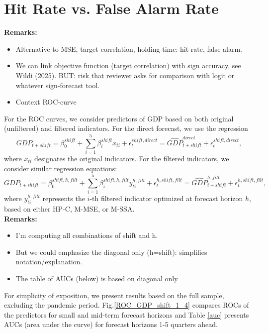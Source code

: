 \documentclass[a4paper]{article}
\begin{document}
\section{Hit Rate vs. False Alarm Rate}


\textbf{Remarks:}
\begin{itemize}
\item Alternative to MSE, target correlation, holding-time: hit-rate, false alarm. 
\item We can link objective function (target correlation) with sign accuracy, see Wildi (2025). BUT: risk that reviewer asks for comparison with logit or whatever sign-forecast tool.
\item Context ROC-curve
\end{itemize}
For the ROC curves, we consider predictors of GDP based on both original (unfiltered) and filtered indicators. For the direct forecast, we use the regression
\[
GDP_{t+shift}=\beta_0^{shift}+\sum_{i=1}^5\beta_i^{shift}x_{ti}+\epsilon_{t}^{shift,direct}=\hat{GDP}_{t+shift}^{direct}+\epsilon_{t}^{shift,direct},
\]
where $x_{ti}$ designates the original indicators. 
For the filtered indicators, we consider similar regression equations:
\[GDP_{t+shift}=\beta_0^{shift,h,filt}+\sum_{i=1}^5\beta_i^{shift,h,filt}y_{ti}^{h,filt}+\epsilon_{t}^{h,shift,filt}=\hat{GDP}_{t+shift}^{h,filt}+\epsilon_{t}^{h,shift,filt},\]
where $y_{ti}^{h,filt}$ represents the $i$-th filtered indicator optimized at forecast horizon $h$, based on either HP-C, M-MSE, or M-SSA. \\
\textbf{Remarks:}
\begin{itemize}
\item I'm computing all combinations of shift and h. 
\item But we could emphasize the diagonal only (h=shift): simplifies notation/explanation.
\item The table of AUCs (below) is based on diagonal only
\end{itemize}
For simplicity of exposition, we present results based on the full sample, excluding the pandemic period. Fig.\ref{ROC_GDP_shift_1_4} compares ROCs of the predictors for small and mid-term forecast horizons and Table \ref{auc} presents AUCs (area under the curve) for forecast horizons 1-5 quarters ahead.
\end{document}
